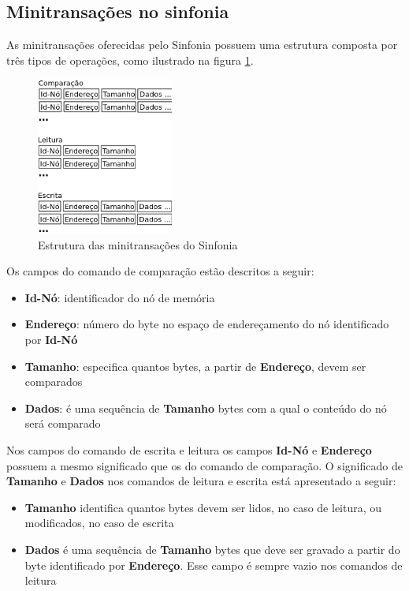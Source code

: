 \documentclass[11pt,twoside,a4paper]{book}
\begin{document}
\subsection{Minitransações no sinfonia}
\label{subsec:minitransacoes_sinfonia}
As minitransações oferecidas pelo Sinfonia possuem uma estrutura composta por três tipos de operações, como ilustrado na figura \ref{fig:minitransacao_sinfonia}.

\begin{figure}
  \centering
  \includegraphics[width=0.4\textwidth]{minitransacao_sinfonia} 
  \caption{Estrutura das minitransações do Sinfonia}
  \label{fig:minitransacao_sinfonia} 
\end{figure}

Os campos do comando de comparação estão descritos a seguir:

\begin{itemize}
	\item \textbf{Id-Nó}: identificador do nó de memória
	\item \textbf{Endereço}: número do byte no espaço de endereçamento do nó identificado por \textbf{Id-Nó}
	\item \textbf{Tamanho}: especifica quantos bytes, a partir de \textbf{Endereço}, devem ser comparados
	\item \textbf{Dados}: é uma sequência de \textbf{Tamanho} bytes com a qual o conteúdo do nó será comparado
\end{itemize}

Nos campos do comando de escrita e leitura os campos \textbf{Id-Nó} e \textbf{Endereço} possuem a mesmo significado que os do comando de comparação. O significado de \textbf{Tamanho} e \textbf{Dados} nos comandos de leitura e escrita está apresentado a seguir:

\begin{itemize}
	\item \textbf{Tamanho} identifica quantos bytes devem ser lidos, no caso de leitura, ou modificados, no caso de escrita
	\item \textbf{Dados} é uma sequência de \textbf{Tamanho} bytes que deve ser gravado a partir do byte identificado por \textbf{Endereço}. Esse campo é sempre vazio nos comandos de leitura
\end{itemize}
\end{document}
